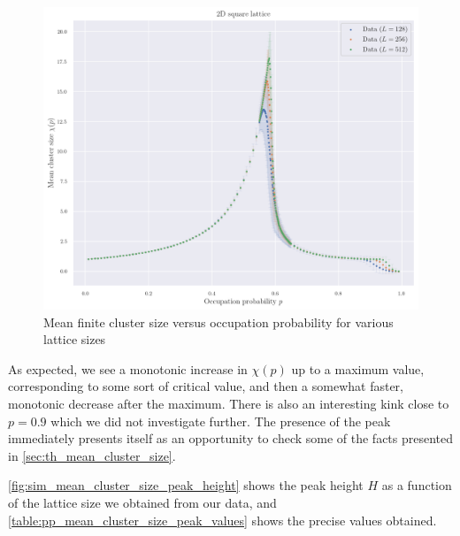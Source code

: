\begin{figure}[H]
  \includegraphics[width=\linewidth]{Images/sim_mean_cluster_size_1.png}
  \caption{Mean finite cluster size versus occupation probability for various lattice sizes}
  \label{fig:sim_mean_cluster_size_1}
\end{figure}


As expected, we see a monotonic increase in $\chi(p)$ up to a maximum value, corresponding to some sort of critical value, and then a somewhat faster, monotonic decrease after the maximum. There is also an interesting kink close to $p=0.9$ which we did not investigate further.
The presence of the peak immediately presents itself as an opportunity to check some of the facts presented in \autoref{sec:th_mean_cluster_size}. 


\autoref{fig:sim_mean_cluster_size_peak_height} shows the peak height $H$ as a function of the lattice size we obtained from our data, and \autoref{table:pp_mean_cluster_size_peak_values} shows the precise values obtained.

